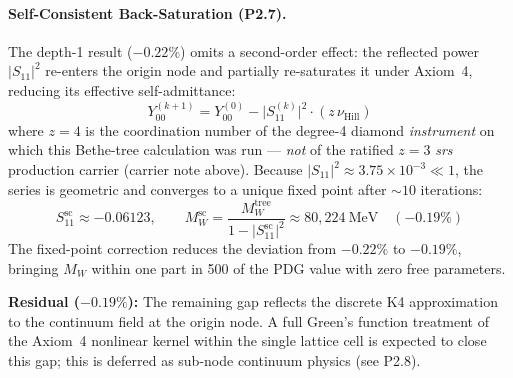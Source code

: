 \paragraph{Self-Consistent Back-Saturation (P2.7).}
The depth-1 result ($-0.22\%$) omits a second-order effect: the reflected power $|S_{11}|^2$ re-enters the origin node and partially re-saturates it under Axiom~4, reducing its effective self-admittance:
\begin{equation}
    Y_{00}^{(k+1)} = Y_{00}^{(0)} - \bigl|S_{11}^{(k)}\bigr|^2 \cdot (z\,\nu_{\text{Hill}})
\end{equation}
where $z = 4$ is the coordination number of the degree-4 diamond \emph{instrument} on which this
Bethe-tree calculation was run --- \emph{not} of the ratified $z = 3$ \emph{srs} production carrier
(carrier note above). Because $|S_{11}|^2 \approx 3.75 \times 10^{-3} \ll 1$, the series is geometric and converges to a unique fixed point after $\sim 10$ iterations:
\begin{equation}
    S_{11}^{\text{sc}} \approx -0.06123, \qquad
    M_W^{\text{sc}} = \frac{M_W^{\text{tree}}}{1 - \bigl|S_{11}^{\text{sc}}\bigr|^2} \approx 80{,}224\ \text{MeV}
    \quad (-0.19\%)
\end{equation}
The fixed-point correction reduces the deviation from $-0.22\%$ to $\mathbf{-0.19\%}$, bringing $M_W$ within one part in 500 of the PDG value with zero free parameters.

\noindent\textbf{Residual ($\mathbf{-0.19\%}$):} The remaining gap reflects the discrete K4 approximation to the continuum field at the origin node. A full Green's function treatment of the Axiom~4 nonlinear kernel within the single lattice cell is expected to close this gap; this is deferred as sub-node continuum physics (see P2.8).

